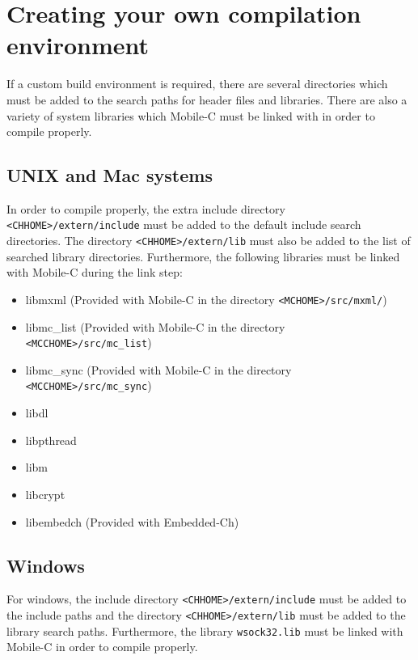 \documentclass[11pt]{report}
\begin{document}
\section{Creating your own compilation environment}
If a custom build environment is required, there are several directories which
must be added to the search paths for header files and libraries. There are 
also a variety of system libraries which Mobile-C must be linked with in order
to compile properly.

\subsection{UNIX and Mac systems}
In order to compile properly, the extra include directory
\texttt{<CHHOME>/extern/include} must be added to the default include search
directories. The directory \texttt{<CHHOME>/extern/lib} must also be added to
the list of searched library directories. Furthermore, the following libraries
must be linked with Mobile-C during the link step:
\begin{itemize}
\item libmxml (Provided with Mobile-C in the directory \texttt{<MCHOME>/src/mxml/})
\item libmc\_list (Provided with Mobile-C in the directory \texttt{<MCCHOME>/src/mc\_list})
\item libmc\_sync (Provided with Mobile-C in the directory \texttt{<MCCHOME>/src/mc\_sync})
\item libdl
\item libpthread
\item libm
\item libcrypt
\item libembedch (Provided with Embedded-Ch)
\end{itemize}

\subsection{Windows}
For windows, the include directory \texttt{<CHHOME>/extern/include} must be added
to the include paths and the directory \texttt{<CHHOME>/extern/lib} must be added
to the library search paths. Furthermore, the library \texttt{wsock32.lib} must
be linked with Mobile-C in order to compile properly.


\end{document}
